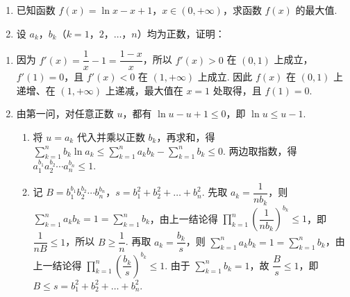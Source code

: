 \begin{problem}
\begin{enumerate}
\item 已知函数 \(f(x)=\ln x-x+1\)，\(x\in(0,+\infty)\)，求函数 \(f(x)\) 的最大值.

\item 设 \(a_k\)，\(b_k\)（\(k=1\)，\(2\)，\(\dots\)，\(n\)）均为正数，证明：

\end{enumerate}
\end{problem}

\begin{solution}
\begin{enumerate}
\item 因为 \(f'(x)=\dfrac{1}{x}-1=\dfrac{1-x}{x}\)，所以 \(f'(x)>0\) 在 \((0,1)\) 上成立，\(f'(1)=0\)，且 \(f'(x)<0\) 在 \((1,+\infty)\) 上成立. 因此 \(f(x)\) 在 \((0,1)\) 上递增、在 \((1,+\infty)\) 上递减，最大值在 \(x=1\) 处取得，且 \(f(1)=0\).
\item 由第一问，对任意正数 \(u\)，都有 \(\ln u-u+1\leqslant0\)，即 \(\ln u\leqslant u-1\).
\begin{enumerate}
\item 将 \(u=a_k\) 代入并乘以正数 \(b_k\)，再求和，得 \(\sum_{k=1}^{n}b_k\ln a_k\leqslant\sum_{k=1}^{n}a_kb_k-\sum_{k=1}^{n}b_k\leqslant0\). 两边取指数，得 \(a_1^{b_1}a_2^{b_2}\cdots a_n^{b_n}\leqslant1\).
\item 记 \(B=b_1^{b_1}b_2^{b_2}\cdots b_n^{b_n}\)，\(s=b_1^2+b_2^2+\dots+b_n^2\). 先取 \(a_k=\dfrac{1}{nb_k}\)，则 \(\sum_{k=1}^{n}a_kb_k=1=\sum_{k=1}^{n}b_k\)，由上一结论得 \(\prod_{k=1}^{n}\left(\dfrac{1}{nb_k}\right)^{b_k}\leqslant1\)，即 \(\dfrac{1}{nB}\leqslant1\)，所以 \(B\geqslant\dfrac{1}{n}\). 再取 \(a_k=\dfrac{b_k}{s}\)，则 \(\sum_{k=1}^{n}a_kb_k=1=\sum_{k=1}^{n}b_k\)，由上一结论得 \(\prod_{k=1}^{n}\left(\dfrac{b_k}{s}\right)^{b_k}\leqslant1\). 由于 \(\sum_{k=1}^{n}b_k=1\)，故 \(\dfrac{B}{s}\leqslant1\)，即 \(B\leqslant s=b_1^2+b_2^2+\dots+b_n^2\).
\end{enumerate}
\end{enumerate}
\end{solution}
